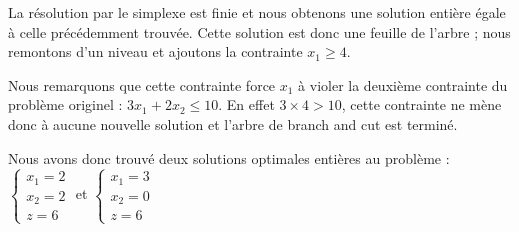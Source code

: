 La résolution par le simplexe est finie et nous obtenons une solution entière égale à celle précédemment trouvée. Cette solution est donc une feuille de l'arbre ; nous remontons d'un niveau et ajoutons la contrainte $x_1 \geq 4$.

Nous remarquons que cette contrainte force $x_1$ à violer la deuxième contrainte du problème originel : $3x_1 + 2x_2 \leq 10$. En effet $3 \times 4 > 10$, cette contrainte ne mène donc à aucune nouvelle solution et l'arbre de branch and cut est terminé.

Nous avons donc trouvé deux solutions optimales entières au problème :\\
$ \begin{cases}
	x_1 = 2 \\
	x_2 = 2 \\
	z = 6
\end{cases} $
et
$ \begin{cases}
	x_1 = 3 \\
	x_2 = 0 \\
	z = 6
\end{cases}$

 
\begin{center}
\end{center}


